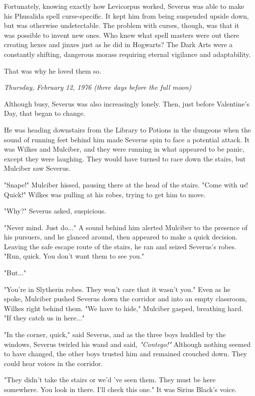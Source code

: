 \documentclass[a4paper,11pt]{article}
\begin{document}
Fortunately, knowing exactly how Levicorpus worked, Severus was able to make his Phusalida spell curse-specific. It kept him from being suspended upside down, but was otherwise undetectable. The problem with curses, though, was that it was possible to invent new ones. Who knew what spell masters were out there creating hexes and jinxes just as he did in Hogwarts? The Dark Arts were a constantly shifting, dangerous morass requiring eternal vigilance and adaptability.

That was why he loved them so.

\emph{Thursday, February 12, 1976 (three days before the full moon)}

Although busy, Severus was also increasingly lonely. Then, just before Valentine's Day, that began to change.

He was heading downstairs from the Library to Potions in the dungeons when the sound of running feet behind him made Severus spin to face a potential attack. It was Wilkes and Mulciber, and they were running in what appeared to be panic, except they were laughing. They would have turned to race down the stairs, but Mulciber saw Severus.

"Snape!" Mulciber hissed, pausing there at the head of the stairs. "Come with us! Quick!" Wilkes was pulling at his robes, trying to get him to move.

"Why?" Severus asked, suspicious.

"Never mind. Just do..." A sound behind him alerted Mulciber to the presence of his pursuers, and he glanced around, then appeared to make a quick decision. Leaving the safe escape route of the stairs, he ran and seized Severus's robes. "Run, quick. You don't want them to see you."

"But..."

"You're in Slytherin robes. They won't care that it wasn't you." Even as he spoke, Mulciber pushed Severus down the corridor and into an empty classroom, Wilkes right behind them. "We have to hide," Mulciber gasped, breathing hard. "If they catch us in here..."

"In the corner, quick," said Severus, and as the three boys huddled by the windows, Severus twirled his wand and said, \emph{"Contego!"} Although nothing seemed to have changed, the other boys trusted him and remained crouched down. They could hear voices in the corridor.

"They didn't take the stairs or we'd 've seen them. They must be here somewhere. You look in there. I'll check this one." It was Sirius Black's voice.
\end{document}
